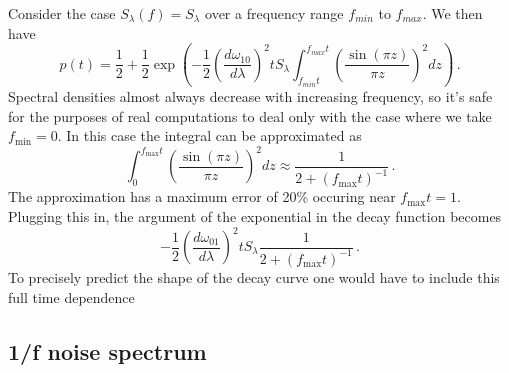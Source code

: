 \documentclass{article}
\begin{document}
Consider the case $S_{\lambda}(f) = S_{\lambda}$ over a frequency range $f_{min}$ to $f_{max}$.
We then have
\begin{equation}
p(t) = \frac{1}{2} + \frac{1}{2}\exp \left( -\frac{1}{2}\left( \frac{d\omega_{10}}{d\lambda} \right)^2 t S_{\lambda} \int_{f_{min}t}^{f_{max}t} \left( \frac{\sin(\pi z)} {\pi z} \right)^2 dz \right) \, .
\end{equation}
Spectral densities almost always decrease with increasing frequency, so it's safe for the purposes of real computations to deal only with the case where we take $f_{\textrm{min}}=0$.
In this case the integral can be approximated as
\begin{equation}
\int_0^{f_{\textrm{max}}t} \left( \frac{\sin(\pi z)}{\pi z} \right)^2 dz \approx \frac{1}{2+(f_{\textrm{max}}t)^{-1}} \, .
\end{equation}
The approximation has a maximum error of 20\% occuring near $f_{\textrm{max}}t = 1$. 
Plugging this in, the argument of the exponential in the decay function becomes \begin{equation}
-\frac{1}{2} \left( \frac{d\omega_{01}}{d\lambda} \right)^2 t S_{\lambda} \frac{1}{2+(f_{\textrm{max}}t)^{-1}} \, .
\end{equation}
To precisely predict the shape of the decay curve one would have to include this full time dependence 


\subsection{1/f noise spectrum}
\end{document}
